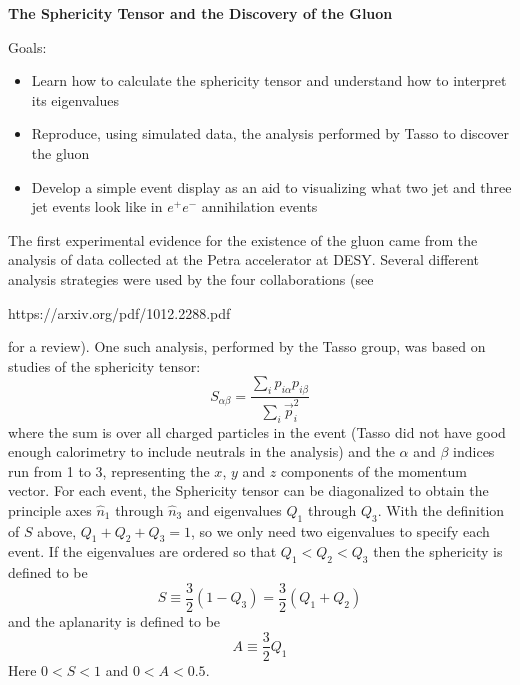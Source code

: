 \documentclass[12pt]{article}
\begin{document}
\begin{center}
{\large\bf The Sphericity Tensor and the Discovery of the Gluon}
\end{center}
\vskip0.2in
Goals:
\begin{itemize}
\item Learn how to calculate the sphericity tensor and understand how to interpret its eigenvalues
\item Reproduce, using simulated data, the analysis performed
  by Tasso to discover the gluon
\item Develop a simple event display as an aid to visualizing
  what two jet and three jet events look like in $e^+e^-$
  annihilation events
\end{itemize}
The first experimental evidence for the existence of the
gluon came from the analysis of data collected at the Petra
accelerator at DESY.  Several different analysis strategies
were used by the four collaborations (see
\begin{center}
  https://arxiv.org/pdf/1012.2288.pdf
\end{center}
for a review).  One such analysis, performed by the
Tasso group, was based on studies of the sphericity tensor:
$$
S_{\alpha\beta} = \frac{\sum_i p_{i\alpha} p_{i\beta}}{\sum_i
  \vec p_i^2}
$$
where the sum is over all charged particles in the event
(Tasso did not have good enough calorimetry to include neutrals
in the analysis) and the $\alpha$ and $\beta$ indices run
from 1 to 3, representing the $x$, $y$ and $z$ components
of the momentum vector.  For each event,
the Sphericity tensor can be
diagonalized to obtain the principle axes $\hat n_1$ through
$\hat n_3$ and eigenvalues $Q_1$ through $Q_3$.
With the definition of $S$ above, $Q_1+Q_2+Q_3=1$, so we only
need two eigenvalues to specify each event. 
If the
eigenvalues are ordered so that $Q_1<Q_2<Q_3$ then the
sphericity is defined to be
$$
S \equiv \frac{3}{2}\left (1 - Q_3\right )  = \frac{3}{2} \left (Q_1+Q_2 \right )
$$
and the aplanarity is defined to be
$$
A \equiv \frac{3}{2} Q_1 
$$
Here $0<S<1$ and $0<A < 0.5$.
\end{document}
